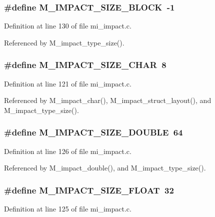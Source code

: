 \subsubsection{\setlength{\rightskip}{0pt plus 5cm}\#define M\_\-IMPACT\_\-SIZE\_\-BLOCK~-1}\label{mi__impact_8c_83c077b1cb1e694d344623bf4cb01cdf}




Definition at line 130 of file mi\_\-impact.c.

Referenced by M\_\-impact\_\-type\_\-size().
\subsubsection{\setlength{\rightskip}{0pt plus 5cm}\#define M\_\-IMPACT\_\-SIZE\_\-CHAR~8}\label{mi__impact_8c_d9ec574c041644b0fb69d8f5c2acd762}




Definition at line 121 of file mi\_\-impact.c.

Referenced by M\_\-impact\_\-char(), M\_\-impact\_\-struct\_\-layout(), and M\_\-impact\_\-type\_\-size().
\subsubsection{\setlength{\rightskip}{0pt plus 5cm}\#define M\_\-IMPACT\_\-SIZE\_\-DOUBLE~64}\label{mi__impact_8c_fd311f4ae867e079333a63f38c6247e2}




Definition at line 126 of file mi\_\-impact.c.

Referenced by M\_\-impact\_\-double(), and M\_\-impact\_\-type\_\-size().
\subsubsection{\setlength{\rightskip}{0pt plus 5cm}\#define M\_\-IMPACT\_\-SIZE\_\-FLOAT~32}\label{mi__impact_8c_4ae8f843dcb0b1ed08fcca42155312f6}




Definition at line 125 of file mi\_\-impact.c.

